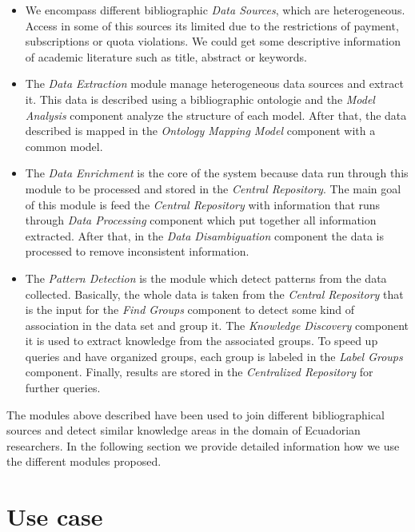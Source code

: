 \documentclass[11pt]{article}
\begin{document}
\begin{itemize}
\item We encompass different bibliographic \emph{Data Sources}, which are heterogeneous. Access in some of this sources its limited due to the restrictions of payment, subscriptions or quota violations. We could get some descriptive information of academic literature such as title, abstract or keywords.
\item The \emph{Data Extraction} module manage heterogeneous data sources and extract it. This data is described using a bibliographic ontologie and  the \emph{Model Analysis} component analyze the structure of each model. After that, the data described is mapped in the \emph{Ontology Mapping Model} component with a common model.
\item The \emph{Data Enrichment} is the core of the system because data run through this module to be processed and stored in the \emph{Central Repository}. The main goal of this module is feed the \emph{Central Repository} with information that runs through \emph{Data Processing} component which put together all information extracted. After that, in the  \emph{Data Disambiguation} component the data is processed to remove inconsistent information.
\item The \emph{Pattern Detection} is the module which detect patterns from the data collected. Basically, the whole data is taken from the \emph{Central Repository}  that is the input for the \emph{Find Groups} component to detect some kind of association in the data set and group it. The \emph{Knowledge Discovery} component it is used to extract knowledge from the associated groups. To speed up queries and have organized groups, each group is labeled in the \emph{Label Groups} component. Finally, results are stored in the \emph{Centralized Repository} for further queries.
\end{itemize}

The modules above described have been used to join different bibliographical sources and detect similar knowledge areas in the domain of Ecuadorian researchers. In the following section we provide detailed information how we use the different modules proposed.

\section{Use case}
\label{label:usecase}
\end{document}
